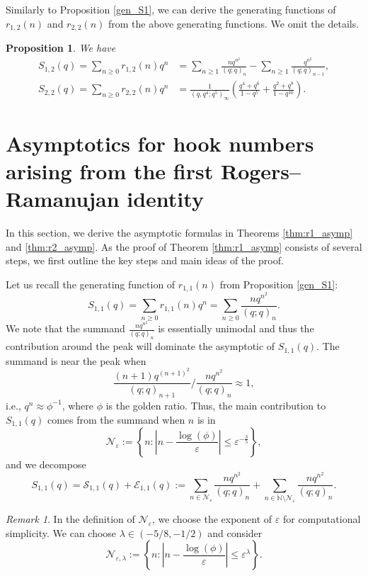 \documentclass[11pt,reqno]{amsart}
\newtheorem{proposition}[theorem]{Proposition}
\theoremstyle{remark}
\newtheorem*{remark}{Remark}
\numberwithin{equation}{section}
\begin{document}
Similarly to Proposition \ref{gen_S1}, we can derive the generating functions of $r_{1,2}(n)$ and $r_{2,2}(n)$ from the above generating functions. We omit the details.

\begin{proposition}\label{gen_S2}
We have
\begin{align*}
	S_{1,2}(q)=\sum_{n\ge 0} r_{1,2}(n) q^n 
	& =\sum_{n\ge 1} \frac{nq^{n^2}}{(q;q)_n} - \sum_{n\ge 1} \frac{ q^{n^2}}{(q;q)_{n-1}}, \\
	S_{2,2}(q)=\sum_{n\ge 0} r_{2,2}(n) q^n  
	&=\frac{1}{(q,q^4;q^5)_{\infty}} \left( \frac{q^4+q^6}{1-q^5}+ \frac{q^2+q^{8}}{1-q^{10}} \right).
\end{align*}
\end{proposition}







\section{Asymptotics for hook numbers arising from the first Rogers--Ramanujan identity}\label{sec4}
In this section, we derive the asymptotic formulas in Theorems \ref{thm:r1_asymp} and \ref{thm:r2_asymp}.
As the proof of Theorem \ref{thm:r1_asymp} consists of several steps, we first outline the key steps and main ideas of the proof. 


Let us recall the generating function of $r_{1,1}(n)$ from Proposition \ref{gen_S1}:
\[
	S_{1,1}(q)=\sum_{n\ge 0} r_{1,1}(n) q^n = \sum_{n\ge 0} \frac{ n q^{n^2} }{(q;q)_n}.
\]
We note that the summand $ \frac{ n q^{n^2} }{(q;q)_n}$ is essentially unimodal and thus the contribution around the peak will dominate the asymptotic of $S_{1,1}(q)$.
The summand is near the peak when
\[
	\frac{ (n+1)q^{(n+1)^2}}{(q;q)_{n+1}} \big/ \frac{n q^{n^2}}{(q;q)_{n}} \approx 1, 
\]
i.e., $q^n \approx \phi^{-1}$, where $\phi$ is the golden ratio. 
Thus, the main contribution to $S_{1,1}(q)$ comes from the summand when $n$ is in
\[
	\mathcal{N}_{\varepsilon}:= \left\{ n : \left| n - \frac{\log (\phi)}{\varepsilon} \right| \le \varepsilon^{-\frac{3}{5}} \right\},
\]
and we decompose
\begin{equation} \label{eqn:decom}
	S_{1,1}(q) = \mathcal{S}_{1,1}(q) + \mathcal{E}_{1,1} (q) :=
 \sum_{n \in \mathcal{N}_{\varepsilon}} \frac{nq^{n^2}}{(q;q)_n} + \sum_{n \in \mathbb{N} \setminus \mathcal{N}_{\varepsilon}}  \frac{nq^{n^2}}{(q;q)_n}. 
\end{equation}
\begin{remark}
In the definition of $\mathcal{N}_\varepsilon$, we choose the exponent of $\varepsilon$ for computational simplicity. 
We can choose $\lambda \in (-5/8,-1/2)$ and consider 
\[
	\mathcal{N}_{\varepsilon, \lambda}:= \left\{ n : \left| n - \frac{\log (\phi)}{\varepsilon} \right| \le \varepsilon^\lambda \right\}. 
\]
\end{remark}
\end{document}
